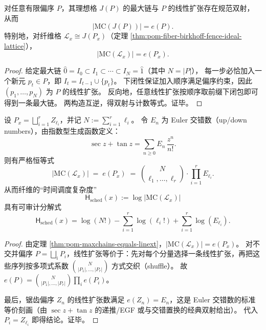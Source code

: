 \begin{theorem}\label{thm:pom-maxchains-equals-linext}
对任意有限偏序 \(P\)，其理想格 \(J(P)\) 的最大链与 \(P\) 的线性扩张存在规范双射，
从而
\[
|\mathrm{MC}(J(P))|=e(P).
\]
特别地，对纤维格 \(\mathcal L_x\cong J(P_x)\)（定理 \ref{thm:pom-fiber-birkhoff-fence-ideal-lattice}），
\[
|\mathrm{MC}(\mathcal L_x)|=e(P_x).
\]
\end{theorem}
\begin{proof}
给定最大链 \(\hat0=I_0\subset I_1\subset\cdots\subset I_N=\hat1\)（其中 \(N=|P|\)），
每一步必恰加入一个新元 \(p_t\in P\)，即 \(I_t=I_{t-1}\cup\{p_t\}\)。
下闭性保证加入顺序满足偏序约束，因此 \((p_1,\dots,p_N)\) 为 \(P\) 的线性扩张。
反向地，任意线性扩张按顺序取前缀下闭包即可得到一条最大链。
两构造互逆，得双射与计数等式。证毕。
\end{proof}

\begin{theorem}\label{thm:pom-fence-maxchains-euler}
设 \(P_x=\bigsqcup_{i=1}^r Z_{\ell_i}\)，并记 \(N:=\sum_{i=1}^r \ell_i\)。
令 \(E_n\) 为 Euler 交错数（up/down numbers），由指数型生成函数定义：
\[
\sec z+\tan z=\sum_{n\ge 0} E_n\,\frac{z^n}{n!}.
\]
则有严格恒等式
\[
|\mathrm{MC}(\mathcal L_x)|
\;=\;
e(P_x)
\;=\;
\binom{N}{\ell_1,\dots,\ell_r}\cdot \prod_{i=1}^r E_{\ell_i}.
\]
从而纤维的“时间调度复杂度”
\[
\mathsf H_{\mathrm{sched}}(x):=\log |\mathrm{MC}(\mathcal L_x)|
\]
具有可审计分解式
\[
\mathsf H_{\mathrm{sched}}(x)
=\log(N!) -\sum_{i=1}^r \log(\ell_i!) + \sum_{i=1}^r \log(E_{\ell_i}).
\]
\end{theorem}
\begin{proof}
由定理 \ref{thm:pom-maxchains-equals-linext}，\(|\mathrm{MC}(\mathcal L_x)|=e(P_x)\)。
对不交并偏序 \(P=\bigsqcup_i P_i\)，线性扩张等价于：先对每个分量选择一条线性扩张，再把这些序列按多项式系数 \(\binom{N}{|P_1|,\dots,|P_r|}\) 方式交织（shuffle）。
故 \(e(P)=\binom{N}{|P_1|,\dots,|P_r|}\prod_i e(P_i)\)。
\par
最后，锯齿偏序 \(Z_n\) 的线性扩张数满足 \(e(Z_n)=E_n\)，这是 Euler 交错数的标准等价刻画（由 \(\sec z+\tan z\) 的递推/EGF 或与交错置换的经典双射给出）。
代入 \(P_i=Z_{\ell_i}\) 即得结论。证毕。
\end{proof}


